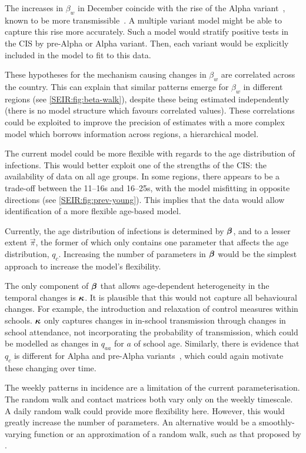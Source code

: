 \documentclass[thesis.tex]{subfiles}
\begin{document}
The increases in $\beta_w$ in December coincide with the rise of the Alpha variant~\autocite{lythgoeLineage}, known to be more transmissible~\autocite[e.g.][]{daviesEstimated}.
A multiple variant model might be able to capture this rise more accurately.
Such a model would stratify positive tests in the CIS by pre-Alpha or Alpha variant.
Then, each variant would be explicitly included in the model to fit to this data.

These hypotheses for the mechanism causing changes in $\beta_w$ are correlated across the country.
This can explain that similar patterns emerge for $\beta_w$ in different regions (see \cref{SEIR:fig:beta-walk}), despite these being estimated independently (\ie there is no model structure which favours correlated values).
These correlations could be exploited to improve the precision of estimates with a more complex model which borrows information across regions, \eg a hierarchical model.

The current model could be more flexible with regards to the age distribution of infections.
This would better exploit one of the strengths of the CIS: the availability of data  on all age groups.
In some regions, there appears to be a trade-off between the 11--16s and 16--25s, with the model misfitting in opposite directions (see \cref{SEIR:fig:prev-young}).
This implies that the data would allow identification of a more flexible age-based model.

Currently, the age distribution of infections is determined by $\bm{\beta}$, and to a lesser extent $\vec{\pi}$, the former of which only contains one parameter that affects the age distribution, $q_c$.
Increasing the number of parameters in $\bm{\beta}$ would be the simplest approach to increase the model's flexibility.

The only component of $\bm{\beta}$ that allows age-dependent heterogeneity in the temporal changes is $\bm{\kappa}$.
It is plausible that this would not capture all behavioural changes.
For example, the introduction and relaxation of control measures within schools.
$\bm{\kappa}$ only captures changes in in-school transmission through changes in school attendance, not incorporating the probability of transmission, which could be modelled as changes in $q_{aa}$ for $a$ of school age.
Similarly, there is evidence that $q_c$ is different for Alpha and pre-Alpha variants~\autocite{zhuRole}, which could again motivate these changing over time.

The weekly patterns in incidence are a limitation of the current parameterisation.
The random walk and contact matrices both vary only on the weekly timescale.
A daily random walk could provide more flexibility here.
However, this would greatly increase the number of parameters.
An alternative would be a smoothly-varying function or an approximation of a random walk, such as that proposed by \textcite{ghoshApproximate}.
\end{document}
